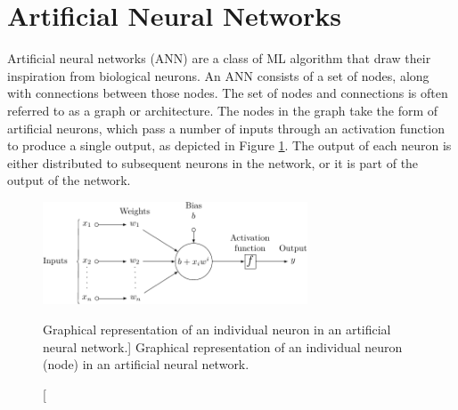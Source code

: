 \section{Artificial Neural Networks}
Artificial neural networks (ANN) are a class of ML algorithm that draw their
inspiration from biological neurons. An ANN consists of a set of nodes, along
with connections between those nodes. The set of nodes and connections is 
often referred to as a graph or architecture. The nodes in the graph take the 
form of artificial neurons, which pass a number of inputs through an 
activation function to produce a single output, as depicted in Figure 
\ref{fig:neuron}. The output of each neuron is either distributed to 
subsequent neurons in the network, or it is part of the output of the network. 
\begin{figure}

	\centering

	\includegraphics[width = 0.7\textwidth]{figures/neuron.pdf}

	\caption
	[Graphical representation of an individual neuron in an artificial neural
	network.]
	{Graphical representation of an individual neuron (node) in an artificial 
	neural network.}

	\label{fig:neuron}

\end{figure}

